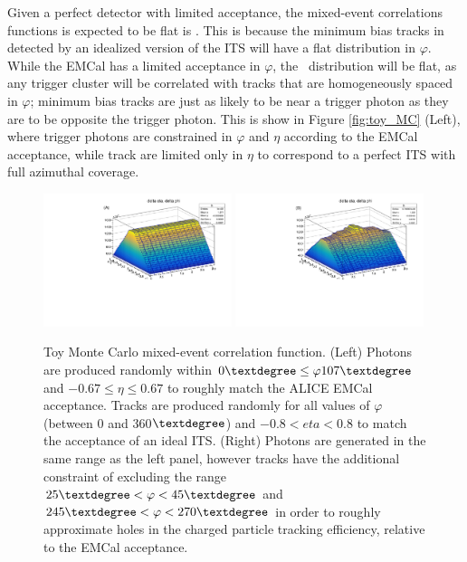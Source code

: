 Given a perfect detector with limited acceptance, the mixed-event correlations functions is expected to be flat is \deltaeta. This is because the minimum bias tracks in detected by an idealized version of the ITS will have a flat distribution in $\varphi$. While the EMCal has a limited acceptance in $\varphi$, the \deltaphi~distribution will be flat, as any trigger cluster will be correlated with tracks that are homogeneously spaced in $\varphi$; minimum bias tracks are just as likely to be near a trigger photon as they are to be opposite the trigger photon. This is show in Figure \ref{fig:toy_MC} (Left), where trigger photons are constrained in $\varphi$ and $\eta$ according to the EMCal acceptance, while track are limited only in $\eta$ to correspond to a perfect ITS with full azimuthal coverage.  

\begin{figure}[htpb]
	\includegraphics[width=0.49\textwidth]{Data_Analysis/EventMixing/toy_MC_no_holes.pdf}
	\includegraphics[width=0.49\textwidth]{Data_Analysis/EventMixing/toy_MC_holes.pdf}
  \caption{Toy Monte Carlo mixed-event correlation function. (Left) Photons are produced randomly within $0\textdegree \leq \varphi 107\textdegree$ and $ -0.67 \leq \eta \leq 0.67$ to roughly match the ALICE EMCal acceptance. Tracks are produced randomly for all values of $\varphi$ (between 0 and 360$\textdegree$) and $-0.8 < eta < 0.8$ to match the acceptance of an ideal ITS. (Right) Photons are generated in the same range as the left panel, however tracks have the additional constraint of excluding the range $ 25\textdegree< \varphi < 45\textdegree$ and $ 245\textdegree < \varphi < 270\textdegree$ in order to roughly approximate holes in the charged particle tracking efficiency, relative to the EMCal acceptance.} 
	\label{fig:toy}
\end{figure}

